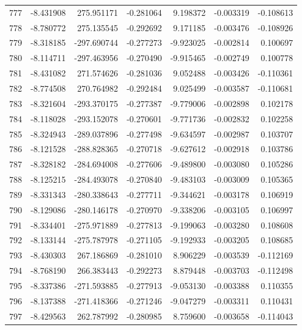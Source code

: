 \begin{tabular}{rrrrrrr}
 777 &  -8.431908 &  275.951171 & -0.281064 &   9.198372 &  -0.003319 & -0.108613 \\
 778 &  -8.780772 &  275.135545 & -0.292692 &   9.171185 &  -0.003476 & -0.108926 \\
 779 &  -8.318185 & -297.690744 & -0.277273 &  -9.923025 &  -0.002814 &  0.100697 \\
 780 &  -8.114711 & -297.463956 & -0.270490 &  -9.915465 &  -0.002749 &  0.100778 \\
 781 &  -8.431082 &  271.574626 & -0.281036 &   9.052488 &  -0.003426 & -0.110361 \\
 782 &  -8.774508 &  270.764982 & -0.292484 &   9.025499 &  -0.003587 & -0.110681 \\
 783 &  -8.321604 & -293.370175 & -0.277387 &  -9.779006 &  -0.002898 &  0.102178 \\
 784 &  -8.118028 & -293.152078 & -0.270601 &  -9.771736 &  -0.002832 &  0.102258 \\
 785 &  -8.324943 & -289.037896 & -0.277498 &  -9.634597 &  -0.002987 &  0.103707 \\
 786 &  -8.121528 & -288.828365 & -0.270718 &  -9.627612 &  -0.002918 &  0.103786 \\
 787 &  -8.328182 & -284.694008 & -0.277606 &  -9.489800 &  -0.003080 &  0.105286 \\
 788 &  -8.125215 & -284.493078 & -0.270840 &  -9.483103 &  -0.003009 &  0.105365 \\
 789 &  -8.331343 & -280.338643 & -0.277711 &  -9.344621 &  -0.003178 &  0.106919 \\
 790 &  -8.129086 & -280.146178 & -0.270970 &  -9.338206 &  -0.003105 &  0.106997 \\
 791 &  -8.334401 & -275.971889 & -0.277813 &  -9.199063 &  -0.003280 &  0.108608 \\
 792 &  -8.133144 & -275.787978 & -0.271105 &  -9.192933 &  -0.003205 &  0.108685 \\
 793 &  -8.430303 &  267.186869 & -0.281010 &   8.906229 &  -0.003539 & -0.112169 \\
 794 &  -8.768190 &  266.383443 & -0.292273 &   8.879448 &  -0.003703 & -0.112498 \\
 795 &  -8.337386 & -271.593885 & -0.277913 &  -9.053130 &  -0.003388 &  0.110355 \\
 796 &  -8.137388 & -271.418366 & -0.271246 &  -9.047279 &  -0.003311 &  0.110431 \\
 797 &  -8.429563 &  262.787992 & -0.280985 &   8.759600 &  -0.003658 & -0.114043 \\

\end{tabular}
